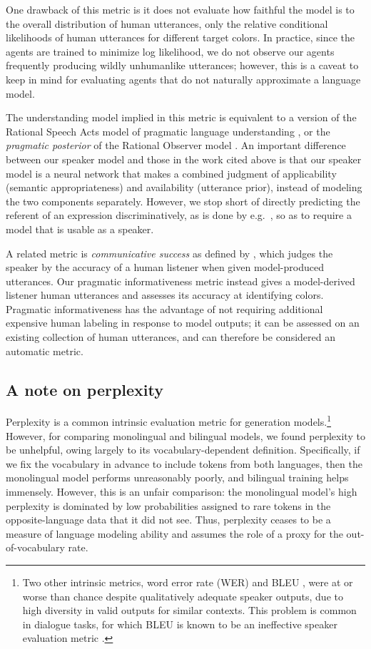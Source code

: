 \documentclass[11pt,a4paper]{article}
\renewcommand{\|}{\mid}
\begin{document}
One drawback of this metric is it does not evaluate how faithful the model is to the overall distribution of human utterances, only the relative conditional likelihoods of human utterances for different target colors. In practice, since the agents are trained to minimize log likelihood, we do not observe our agents frequently producing wildly unhumanlike utterances; however, this is a caveat to keep in mind for evaluating agents that do not naturally approximate a language model.

The understanding model implied in this metric is equivalent to a version of the Rational Speech Acts model of pragmatic language understanding \cite{Frank2012,GoodmanFrank16_RSATiCS}, or the \emph{pragmatic posterior} of the
Rational Observer model \cite{McMahan:Stone:2015}. An important difference between our 
speaker model and those in the work cited above is that our speaker model is a neural 
network that makes a combined judgment of applicability (semantic appropriateness) and 
availability (utterance prior), instead of modeling the two components separately.
However, we stop short of directly predicting the referent of an expression
discriminatively, as is done by e.g.\ \citet{Kennington2015}, so as to require a
model that is usable as a speaker.

A related metric is \emph{communicative success} as defined by \citet{Golland2010}, which judges the speaker by the accuracy of a human listener when given model-produced utterances. Our pragmatic informativeness metric instead gives a model-derived listener human utterances and assesses its accuracy at identifying colors. Pragmatic informativeness has the advantage of not requiring additional expensive human labeling in response to model outputs; it can be assessed on an existing collection of human utterances, and can therefore be considered an automatic metric.

\subsection{A note on perplexity}

Perplexity is a common intrinsic evaluation metric for generation
models.\footnote{Two other intrinsic metrics, word error
rate (WER) and BLEU \cite{Papineni2002}, were at or worse than
chance despite qualitatively adequate speaker outputs, due to high diversity in valid 
outputs for similar contexts. This problem is common in dialogue tasks,
for which BLEU is known to be an ineffective speaker evaluation metric \cite{Liu2016}.}
However, for comparing monolingual and bilingual models,
we found perplexity to be
unhelpful, owing largely to its vocabulary-dependent definition. Specifically, if we fix the vocabulary in advance to include tokens
from both languages, then the monolingual model performs
unreasonably poorly, and bilingual training helps immensely. However, this is an unfair comparison: the monolingual model's high perplexity
is dominated by low probabilities assigned to rare tokens in the opposite-language data that it did not see. Thus, perplexity ceases to
be a measure of language modeling ability and assumes the role of a proxy for the out-of-vocabulary rate.
\end{document}
